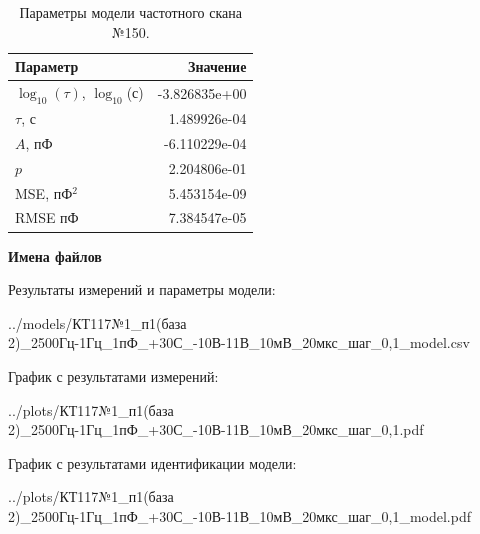 \begin{table}[!ht]
    \centering
    \caption{Параметры модели частотного скана №150.}
    \begin{tabular}{|l|r|}
        \hline
        Параметр                                       & Значение                  \\ \hline
        $\log_{10}(\tau)$, $\log_{10}$(с)              & -3.826835e+00             \\ \hline
        $\tau$, с                                      & 1.489926e-04              \\ \hline
        $A$, пФ                                        & -6.110229e-04             \\ \hline
        $p$                                            & 2.204806e-01              \\ \hline
        MSE, пФ$^2$                                    & 5.453154e-09              \\ \hline
        RMSE пФ                                        & 7.384547e-05              \\ \hline
    \end{tabular}
    \label{table:frequency_scan_model_150}
\end{table}

\textbf{Имена файлов}

Результаты измерений и параметры модели:

\scriptsize../models/КТ117№1\_п1(база 2)\_2500Гц-1Гц\_1пФ\_+30С\_-10В-11В\_10мВ\_20мкс\_шаг\_0,1\_model.csv
\normalsize

График с результатами измерений:

\scriptsize../plots/КТ117№1\_п1(база 2)\_2500Гц-1Гц\_1пФ\_+30С\_-10В-11В\_10мВ\_20мкс\_шаг\_0,1.pdf
\normalsize

График с результатами идентификации модели:

\scriptsize../plots/КТ117№1\_п1(база 2)\_2500Гц-1Гц\_1пФ\_+30С\_-10В-11В\_10мВ\_20мкс\_шаг\_0,1\_model.pdf
\normalsize

